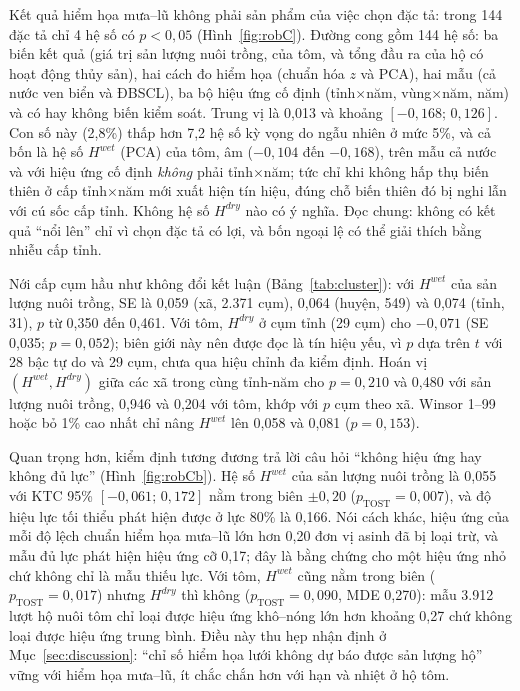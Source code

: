 \documentclass[12pt,a4paper]{article}
\begin{document}
Kết quả hiểm họa mưa--lũ không phải sản phẩm của việc chọn đặc tả: trong 144 đặc tả chỉ 4 hệ số có $p<0{,}05$ (Hình~\ref{fig:robC}). Đường cong gồm 144 hệ số: ba biến kết quả (giá trị sản lượng nuôi trồng, của tôm, và tổng đầu ra của hộ có hoạt động thủy sản), hai cách đo hiểm họa (chuẩn hóa $z$ và PCA), hai mẫu (cả nước ven biển và ĐBSCL), ba bộ hiệu ứng cố định (tỉnh$\times$năm, vùng$\times$năm, năm) và có hay không biến kiểm soát. Trung vị là 0,013 và khoảng $[-0{,}168;\,0{,}126]$. Con số này (2,8\%) thấp hơn 7,2 hệ số kỳ vọng do ngẫu nhiên ở mức 5\%, và cả bốn là hệ số $H^{wet}$ (PCA) của tôm, âm ($-0{,}104$ đến $-0{,}168$), trên mẫu cả nước và với hiệu ứng cố định \emph{không} phải tỉnh$\times$năm; tức chỉ khi không hấp thụ biến thiên ở cấp tỉnh$\times$năm mới xuất hiện tín hiệu, đúng chỗ biến thiên đó bị nghi lẫn với cú sốc cấp tỉnh. Không hệ số $H^{dry}$ nào có ý nghĩa. Đọc chung: không có kết quả ``nổi lên'' chỉ vì chọn đặc tả có lợi, và bốn ngoại lệ có thể giải thích bằng nhiễu cấp tỉnh.

Nới cấp cụm hầu như không đổi kết luận (Bảng~\ref{tab:cluster}): với $H^{wet}$ của sản lượng nuôi trồng, SE là 0,059 (xã, 2.371 cụm), 0,064 (huyện, 549) và 0,074 (tỉnh, 31), $p$ từ 0,350 đến 0,461. Với tôm, $H^{dry}$ ở cụm tỉnh (29 cụm) cho $-0{,}071$ (SE 0,035; $p=0{,}052$); biên giới này nên được đọc là tín hiệu yếu, vì $p$ dựa trên $t$ với 28 bậc tự do và 29 cụm, chưa qua hiệu chỉnh đa kiểm định. Hoán vị $(H^{wet},H^{dry})$ giữa các xã trong cùng tỉnh-năm cho $p=0{,}210$ và 0,480 với sản lượng nuôi trồng, 0,946 và 0,204 với tôm, khớp với $p$ cụm theo xã. Winsor 1--99 hoặc bỏ 1\% cao nhất chỉ nâng $H^{wet}$ lên 0,058 và 0,081 ($p=0{,}153$).

Quan trọng hơn, kiểm định tương đương trả lời câu hỏi ``không hiệu ứng hay không đủ lực'' (Hình~\ref{fig:robCb}). Hệ số $H^{wet}$ của sản lượng nuôi trồng là 0,055 với KTC 95\% $[-0{,}061;\,0{,}172]$ nằm trong biên $\pm0{,}20$ ($p_{\text{TOST}}=0{,}007$), và độ hiệu lực tối thiểu phát hiện được ở lực 80\% là 0,166. Nói cách khác, hiệu ứng của mỗi độ lệch chuẩn hiểm họa mưa--lũ lớn hơn 0,20 đơn vị asinh đã bị loại trừ, và mẫu đủ lực phát hiện hiệu ứng cỡ 0,17; đây là bằng chứng cho một hiệu ứng nhỏ chứ không chỉ là mẫu thiếu lực. Với tôm, $H^{wet}$ cũng nằm trong biên ($p_{\text{TOST}}=0{,}017$) nhưng $H^{dry}$ thì không ($p_{\text{TOST}}=0{,}090$, MDE 0,270): mẫu 3.912 lượt hộ nuôi tôm chỉ loại được hiệu ứng khô--nóng lớn hơn khoảng 0,27 chứ không loại được hiệu ứng trung bình. Điều này thu hẹp nhận định ở Mục~\ref{sec:discussion}: ``chỉ số hiểm họa lưới không dự báo được sản lượng hộ'' vững với hiểm họa mưa--lũ, ít chắc chắn hơn với hạn và nhiệt ở hộ tôm.
\end{document}
